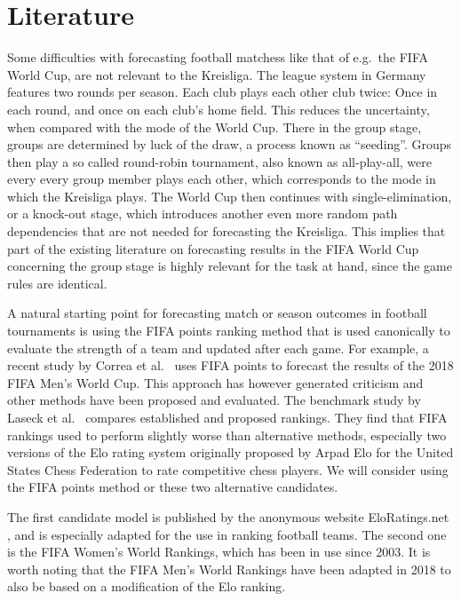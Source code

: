 \documentclass[12pt,a4paper]{article}
\begin{document}
\hypertarget{literature}{%
\section{Literature}\label{literature}}

Some difficulties with forecasting football matchess like that of
e.g.~the FIFA World Cup, are not relevant to the Kreisliga. The league
system in Germany features two rounds per season. Each club plays each
other club twice: Once in each round, and once on each club's home
field. This reduces the uncertainty, when compared with the mode of the
World Cup. There in the group stage, groups are determined by luck of
the draw, a process known as \enquote{seeding}. Groups then play a so
called round-robin tournament, also known as all-play-all, were every
every group member plays each other, which corresponds to the mode in
which the Kreisliga plays. The World Cup then continues with
single-elimination, or a knock-out stage, which introduces another even
more random path dependencies that are not needed for forecasting the
Kreisliga. This implies that part of the existing literature on
forecasting results in the FIFA World Cup concerning the group stage is
highly relevant for the task at hand, since the game rules are
identical.

A natural starting point for forecasting match or season outcomes in
football tournaments is using the FIFA points ranking method that is
used canonically to evaluate the strength of a team and updated after
each game. For example, a recent study by Correa et
al.~\autocite*{correa} uses FIFA points to forecast the results of the
2018 FIFA Men's World Cup. This approach has however generated criticism
and other methods have been proposed and evaluated. The benchmark study
by Laseck et al.~\autocite*{lasek2013} compares established and proposed
rankings. They find that FIFA rankings used to perform slightly worse
than alternative methods, especially two versions of the Elo rating
system originally proposed by Arpad Elo for the United States Chess
Federation to rate competitive chess players. We will consider using the
FIFA points method or these two alternative candidates.

The first candidate model is published by the anonymous website
EloRatings.net \autocite*{eloratings}, and is especially adapted for the
use in ranking football teams. The second one is the FIFA Women's World
Rankings, which has been in use since 2003. It is worth noting that the
FIFA Men's World Rankings have been adapted in 2018 to also be based on
a modification of the Elo ranking.
\end{document}
